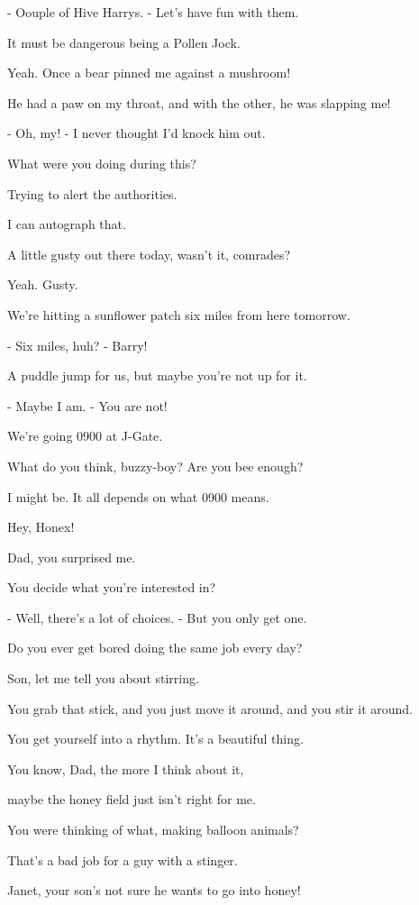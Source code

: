 \documentclass[journal]{IEEEtran}
\begin{document}
  
- Oouple of Hive Harrys.
- Let's have fun with them.

  
It must be dangerous
being a Pollen Jock.

  
Yeah. Once a bear pinned me
against a mushroom!

  
He had a paw on my throat,
and with the other, he was slapping me!

  
- Oh, my!
- I never thought I'd knock him out.

  
What were you doing during this?

  
Trying to alert the authorities.

  
I can autograph that.

  
A little gusty out there today,
wasn't it, comrades?

  
Yeah. Gusty.

  
We're hitting a sunflower patch
six miles from here tomorrow.

  
- Six miles, huh?
- Barry!

  
A puddle jump for us,
but maybe you're not up for it.

  
- Maybe I am.
- You are not!

  
We're going 0900 at J-Gate.

  
What do you think, buzzy-boy?
Are you bee enough?

  
I might be. It all depends
on what 0900 means.

  
Hey, Honex!

  
Dad, you surprised me.

  
You decide what you're interested in?

  
- Well, there's a lot of choices.
- But you only get one.

  
Do you ever get bored
doing the same job every day?

  
Son, let me tell you about stirring.

  
You grab that stick, and you just
move it around, and you stir it around.

  
You get yourself into a rhythm.
It's a beautiful thing.

  
You know, Dad,
the more I think about it,

  
maybe the honey field
just isn't right for me.

  
You were thinking of what,
making balloon animals?

  
That's a bad job
for a guy with a stinger.

  
Janet, your son's not sure
he wants to go into honey!
\end{document}
